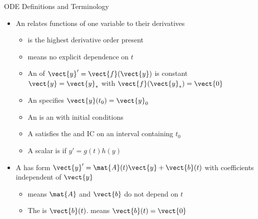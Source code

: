 \begin{frame}{ODE Definitions and Terminology}
\begin{itemize}
\setlength{\itemsep}{0pt}\setlength{\parsep}{0pt}
  \item An  relates functions of one variable to their derivatives
  \begin{itemize}
  \setlength{\itemsep}{0pt}\setlength{\parsep}{0pt}
    \item {} is the highest derivative order present
    \item {} means no explicit dependence on $t$
    \item An  of $\vect{y}'=\vect{f}(\vect{y})$
    is constant $\vect{y}=\vect{y}_*$ with $\vect{f}(\vect{y}_*)=\vect{0}$
    \item An  specifies $\vect{y}(t_0)=\vect{y}_0$
    \item An  is an  with initial conditions
    \item A  satisfies the  and IC on an interval containing $t_0$
    \item A scalar  is  if $y'=g(t)h(y)$
  \end{itemize}
  \item A  has form $\vect{y}'=\mat{A}(t)\vect{y}+\vect{b}(t)$
  with coefficients independent of $\vect{y}$
  \begin{itemize}
  \setlength{\itemsep}{0pt}\setlength{\parsep}{0pt}
    \item {} means $\mat{A}$ and $\vect{b}$ do not depend on $t$
    \item The  is $\vect{b}(t)$.  means $\vect{b}(t)=\vect{0}$
  \end{itemize}
\end{itemize}
\end{frame}
